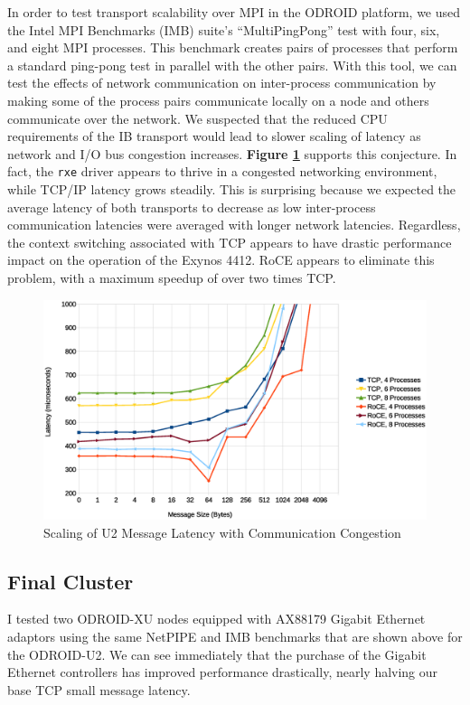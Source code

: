 \documentclass[11pt]{book}
\begin{document}
In order to test transport scalability over MPI in the ODROID platform, we used
the Intel MPI Benchmarks (IMB) suite's ``MultiPingPong'' test with four, six,
and eight MPI processes. This benchmark creates pairs of processes that perform
a standard ping-pong test in parallel with the other pairs. With this tool, we
can test the effects of network communication on inter-process communication by
making some of the process pairs communicate locally on a node and others
communicate over the network. We suspected that the reduced CPU requirements of
the IB transport would lead to slower scaling of latency as network and I/O bus
congestion increases. \textbf{Figure \ref{multipingpong-u2}} supports this
conjecture. In fact, the \verb;rxe; driver appears to thrive in a congested
networking environment, while TCP/IP latency grows steadily. This is surprising
because we expected the average latency of both transports to decrease as low
inter-process communication latencies were averaged with longer network
latencies. Regardless, the context switching associated with TCP appears to have
drastic performance impact on the operation of the Exynos 4412. RoCE appears to
eliminate this problem, with a maximum speedup of over two times TCP.

\begin{figure}[h]
\includegraphics[width=\textwidth]{pingpong_multi_zoom}
\caption{Scaling of U2 Message Latency with Communication Congestion}
\label{multipingpong-u2}
\end{figure}

\subsection{\textbf{Final Cluster}}
\label{final-cluster-benchmarks}

I tested two ODROID-XU nodes equipped with AX88179 Gigabit Ethernet adaptors
using the same NetPIPE and IMB benchmarks that are shown above for the
ODROID-U2. We can see immediately that the purchase of the Gigabit Ethernet
controllers has improved performance drastically, nearly halving our base TCP
small message latency.
\end{document}
